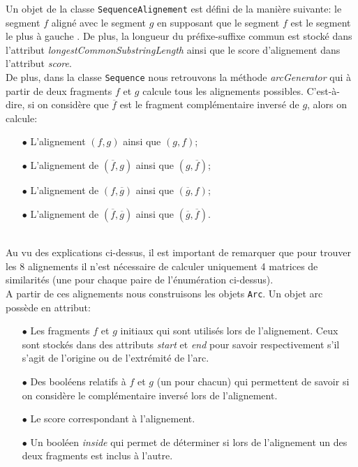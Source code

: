 Un objet de la classe \verb|SequenceAlignement| est défini de la manière
suivante: le segment $f$ aligné avec le segment $g$ en supposant que le
segment $f$ est le segment le plus à \og gauche \fg. De plus, la longueur du
préfixe-suffixe commun est stocké dans l'attribut \emph{longestCommonSubstringLength} ainsi que le score d'alignement dans l'attribut \emph{score}.\\

De plus, dans la classe \verb|Sequence| nous retrouvons la méthode \emph{arcGenerator} qui à partir de deux fragments $f$ et $g$ calcule tous les alignements possibles. C'est-à-dire, si on considère que $\overline{f}$ est le fragment complémentaire inversé de $g$, alors on calcule:\\
\begin{itemize}
	\item[$\bullet$] L'alignement $(f,g)$ ainsi que $(g,f)$;
	\item[$\bullet$] L'alignement de $(\overline{f},g)$ ainsi que $(g, \overline{f})$;
	\item[$\bullet$] L'alignement de $(f, \overline{g})$ ainsi que $(\overline{g},f)$;
	\item[$\bullet$] L'alignement de $(\overline{f}, \overline{g})$ ainsi que $(\overline{g}, \overline{f})$.
\end{itemize}
$ $\\
Au vu des explications ci-dessus, il est important de remarquer que pour trouver les 8 alignements il n'est nécessaire de calculer uniquement 4 matrices de similarités (une pour chaque paire de l'énumération ci-dessus).\\

A partir de ces alignements nous construisons les objets \verb|Arc|. Un objet arc possède en attribut:\\

\begin{itemize}
	\item[$\bullet$] Les fragments $f$ et $g$ initiaux qui sont utilisés lors de l'alignement. Ceux sont stockés dans des attributs \emph{start} et \emph{end} pour savoir respectivement s'il s'agit de l'origine ou de l'extrémité de l'arc.
	\item[$\bullet$] Des booléens relatifs à $f$ et $g$ (un pour chacun) qui permettent de savoir si on considère le complémentaire inversé lors de l'alignement.
	\item[$\bullet$] Le score correspondant à l'alignement.
	\item[$\bullet$] Un booléen \emph{inside} qui permet de déterminer si lors de l'alignement un des deux fragments est inclus à l'autre.
	
\end{itemize}

